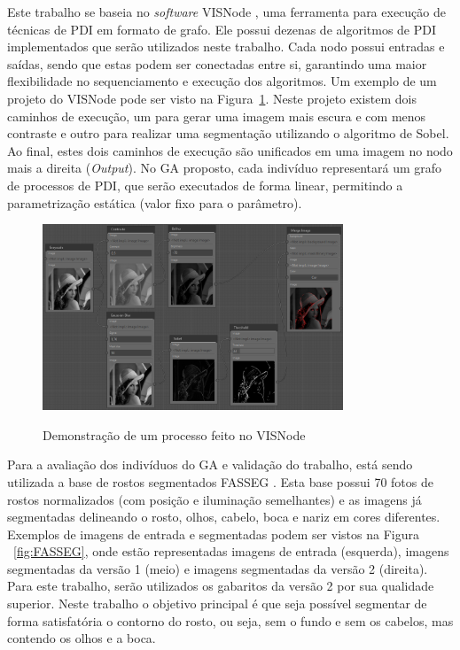 \documentclass[12pt,oneside,a4paper,english,french,spanish,brazil,]{abntex2}
\begin{document}
Este trabalho se baseia no \textit{software} VISNode \cite{visnode:2018}, uma ferramenta para execução de técnicas de PDI em formato de grafo. Ele possui dezenas de algoritmos de PDI implementados que serão utilizados neste trabalho. Cada nodo possui entradas e saídas, sendo que estas podem ser conectadas entre si, garantindo uma maior flexibilidade no sequenciamento e execução dos algoritmos. Um exemplo de um projeto do VISNode pode ser visto na Figura~\ref{fig:PRO_Visnode}. Neste projeto existem dois caminhos de execução, um para gerar uma imagem mais escura e com menos contraste e outro para realizar uma segmentação utilizando o algoritmo de Sobel. Ao final, estes dois caminhos de execução são unificados em uma imagem no nodo mais a direita (\textit{Output}). No GA proposto, cada indivíduo representará um grafo de processos de PDI, que serão executados de forma linear, permitindo a parametrização estática (valor fixo para o parâmetro).

\begin{figure}[ht]
\centering
\caption{Demonstração de um processo feito no VISNode}
\includegraphics[width=0.8\textwidth]{imagens/PRO_Visnode.PNG}
\sourceAuthor
\label{fig:PRO_Visnode}
\end{figure}

Para a avaliação dos indivíduos do GA e validação do trabalho, está sendo utilizada a base de rostos segmentados FASSEG \cite{fasseg:2018}. Esta base possui 70 fotos de rostos normalizados (com posição e iluminação semelhantes) e as imagens já segmentadas delineando o rosto, olhos, cabelo, boca e nariz em cores diferentes. Exemplos de imagens de entrada e segmentadas podem ser vistos na Figura ~\ref{fig:FASSEG}, onde estão representadas imagens de entrada (esquerda), imagens segmentadas da versão 1 (meio) e imagens segmentadas da versão 2 (direita). Para este trabalho, serão utilizados os gabaritos da versão 2 por sua qualidade superior. Neste trabalho o objetivo principal é que seja possível segmentar de forma satisfatória o contorno do rosto, ou seja, sem o fundo e sem os cabelos, mas contendo os olhos e a boca.
\end{document}
